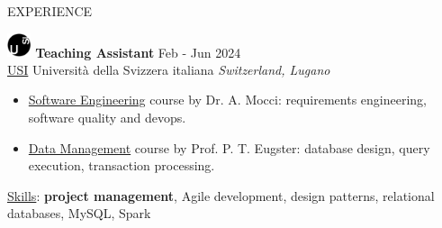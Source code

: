 \documentclass{cv} %
\def\intraexpvspace{0.15cm}
\def\titlelistvspace{-0.15cm}
\begin{document}
\begin{rSection}{EXPERIENCE}


    \includegraphics[width=0.7cm, trim={0cm 10cm 0cm 0cm}]{usi-icon.png}
    \hspace*{0cm}\textbf{Teaching Assistant} \hfill Feb - Jun 2024\\
    \hspace*{0.85cm}\href{https://www.usi.ch/}{USI} Università della Svizzera italiana
    \hfill \textit{Switzerland, Lugano}
    \vspace{\titlelistvspace}\begin{itemize}
        \itemsep -3pt {}
        \item \href{https://search.usi.ch/it/corsi/35268192/software-atelier-4-software-engineering-project}{Software Engineering}
              course by Dr. A. Mocci: requirements engineering, software quality and devops.

        \item \href{https://search.usi.ch/it/corsi/35268184/data-management}{Data Management}
              course by Prof. P. T. Eugster: database design, query execution, transaction processing.
    \end{itemize}
    \vspace*{-0.1cm}\hspace*{0.5cm}\underline{Skills}: \textbf{project management}, Agile development, design patterns, relational databases, MySQL, Spark
    \vspace{\intraexpvspace}


\end{rSection}
\end{document}
